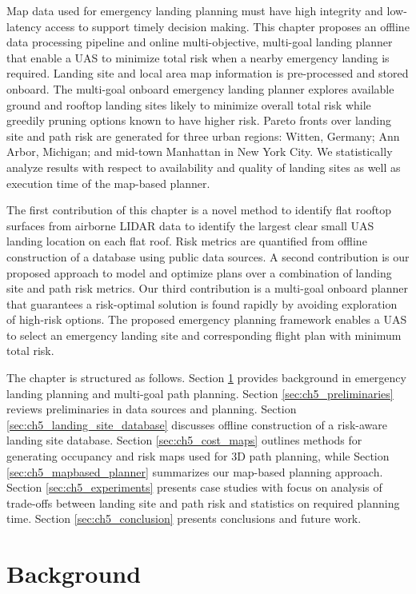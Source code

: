 Map data used for emergency landing planning must have high integrity and low-latency access to support timely decision making. This chapter proposes an offline data processing pipeline and online multi-objective, multi-goal landing planner that enable a \ac{UAS} to minimize total risk when a nearby emergency landing is required. Landing site and local area map information is pre-processed and stored onboard.  The multi-goal onboard emergency landing planner explores available ground and rooftop landing sites likely to minimize overall total risk while greedily pruning options known to have higher risk.   Pareto fronts over landing site and path risk are generated for three urban regions: Witten, Germany; Ann Arbor, Michigan; and mid-town Manhattan in New York City. We statistically analyze results with respect to availability and quality of landing sites as well as execution time of the map-based planner.

The first contribution of this chapter is a novel method to identify flat rooftop surfaces from airborne LIDAR data to identify the largest clear small \ac{UAS} landing location on each flat roof. Risk metrics are quantified from offline construction of a database using public data sources. A second contribution is our proposed approach to model and optimize plans over a combination of landing site and path risk metrics.  Our third contribution is a multi-goal onboard planner that guarantees a risk-optimal solution is found rapidly by avoiding exploration of high-risk options. The proposed emergency planning framework enables a \ac{UAS} to select an emergency landing site and  corresponding flight plan with minimum total risk.

The chapter is structured as follows. Section \ref{sec:ch5_background} provides background in emergency landing planning and multi-goal path planning.  Section \ref{sec:ch5_preliminaries} reviews preliminaries in data sources and planning. Section \ref{sec:ch5_landing_site_database} discusses offline construction of a risk-aware landing site database. Section \ref{sec:ch5_cost_maps} outlines methods for generating occupancy and risk maps used for 3D path planning, while Section \ref{sec:ch5_mapbased_planner} summarizes our map-based planning approach. Section \ref{sec:ch5_experiments} presents case studies with focus on analysis of trade-offs between landing site and path risk and statistics on required planning time.  Section \ref{sec:ch5_conclusion} presents conclusions and future work.

\section{Background}\label{sec:ch5_background}

